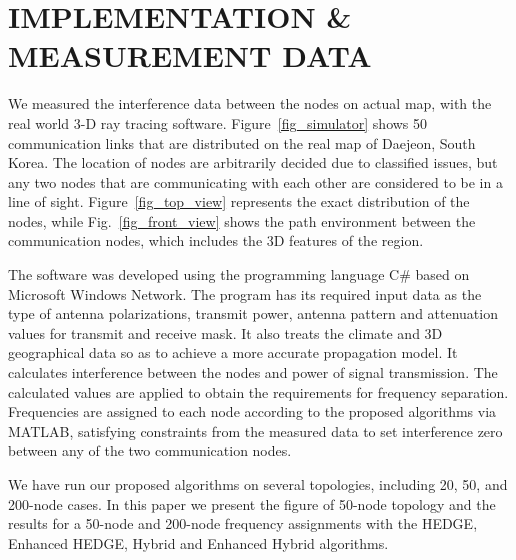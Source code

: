 \documentclass[10pt,twocolumn,twoside]{JCNtran}
\begin{document}
\begin{figure*}[!t]
	\begin{center}
	\end{center}
	\caption{An example of topology for analysis with the measured data, covering Daejeon region in South Korea with 50 communication nodes. The topology is considering 3-D environments based on the real geographical features.}
	\label{fig_simulator}
\end{figure*}
\section{\uppercase{Implementation \& Measurement Data}}
\label{sec_implementation}

We measured the interference data between the nodes on actual map, with the real world 3-D ray tracing software. Figure~\ref{fig_simulator} shows 50 communication links that are distributed on the real map of Daejeon, South Korea. The location of nodes are arbitrarily decided due to classified issues, but any two nodes that are communicating with each other are considered to be in a line of sight.  Figure~\ref{fig_top_view} represents the exact distribution of the nodes, while Fig.~\ref{fig_front_view} shows the path environment between the communication nodes, which includes the 3D features of the region.

The software was developed using the programming language C\# based on Microsoft Windows Network. The program has its required input data as the type of antenna polarizations, transmit power, antenna pattern and attenuation values for transmit and receive mask. It also treats the climate and 3D geographical data so as to achieve a more accurate propagation model. It calculates interference between the nodes and power of signal transmission. The calculated values are applied to obtain the requirements for frequency separation. Frequencies are assigned to each node according to the proposed algorithms via MATLAB, satisfying constraints from the measured data to set interference zero between any of the two communication nodes.

We have run our proposed algorithms on several topologies, including 20, 50, and 200-node cases. In this paper we present the figure of 50-node topology and the results for a 50-node and 200-node frequency assignments with the HEDGE, Enhanced HEDGE, Hybrid and Enhanced Hybrid algorithms.
\end{document}
